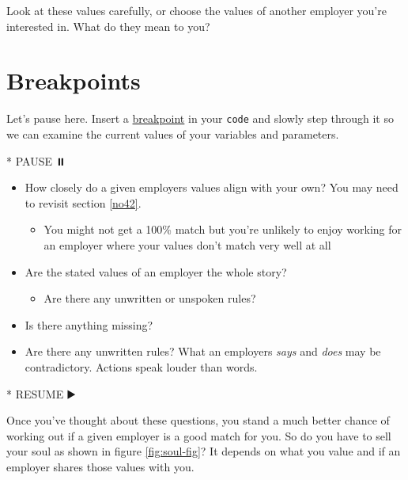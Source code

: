 \documentclass[
]{book}
\newenvironment{Shaded}{\begin{snugshade}}{\end{snugshade}}
\newcommand{\NormalTok}[1]{#1}
\newcommand{\SpecialStringTok}[1]{\textcolor[rgb]{0.31,0.60,0.02}{#1}}
\providecommand{\tightlist}{%
  \setlength{\itemsep}{0pt}\setlength{\parskip}{0pt}}
\begin{document}
Look at these values carefully, or choose the values of another employer you're interested in. What do they mean to you?

\hypertarget{bp9}{%
\section{Breakpoints}\label{bp9}}

Let's pause here. Insert a \href{https://en.wikipedia.org/wiki/Breakpoint}{breakpoint} in your \texttt{code} and slowly step through it so we can examine the current values of your variables and parameters.

\begin{Shaded}
\begin{Highlighting}[]
\SpecialStringTok{* }\NormalTok{PAUSE ⏸️}
\end{Highlighting}
\end{Shaded}

\begin{itemize}
\tightlist
\item
  How closely do a given employers values align with your own? You may need to revisit section \ref{no42}.

  \begin{itemize}
  \tightlist
  \item
    You might not get a 100\% match but you're unlikely to enjoy working for an employer where your values don't match very well at all
  \end{itemize}
\item
  Are the stated values of an employer the whole story?

  \begin{itemize}
  \tightlist
  \item
    Are there any unwritten or unspoken rules?
  \end{itemize}
\item
  Is there anything missing?
\item
  Are there any unwritten rules? What an employers \emph{says} and \emph{does} may be contradictory. Actions speak louder than words.
\end{itemize}

\begin{Shaded}
\begin{Highlighting}[]
\SpecialStringTok{* }\NormalTok{RESUME ▶️}
\end{Highlighting}
\end{Shaded}

Once you've thought about these questions, you stand a much better chance of working out if a given employer is a good match for you. So do you have to sell your soul as shown in figure \ref{fig:soul-fig}? It depends on what you value and if an employer shares those values with you.
\end{document}

